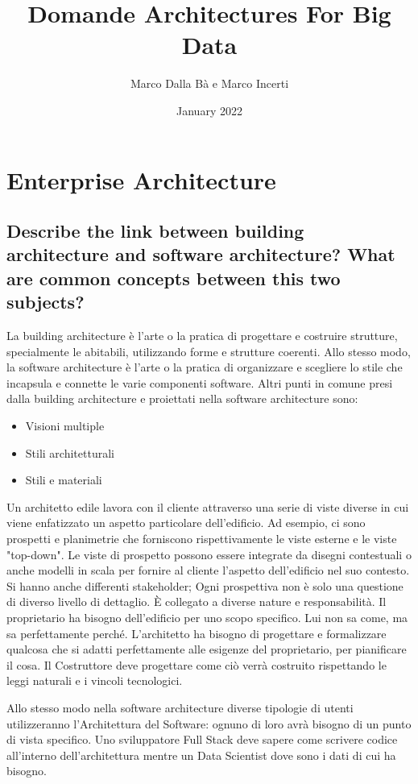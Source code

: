 \documentclass{article}
\title{Domande Architectures For Big Data}
\author{Marco Dalla Bà e Marco Incerti}
\date{January 2022}
\begin{document}
\maketitle
\tableofcontents

\section{Enterprise Architecture}
\subsection{Describe the link between building architecture and software architecture? What are common concepts between this two subjects?}

La building architecture è l’arte o la pratica di progettare e costruire strutture, specialmente le abitabili, utilizzando forme e strutture coerenti. Allo stesso modo, la software architecture è l’arte o la pratica di organizzare e scegliere lo stile che incapsula e connette le varie componenti software. 
Altri punti in comune presi dalla building architecture e proiettati nella software architecture sono:
\begin{itemize}
    \item Visioni multiple
    \item Stili architetturali
    \item Stili e materiali
\end{itemize}

Un architetto edile lavora con il cliente attraverso una serie di viste diverse in cui viene enfatizzato un aspetto particolare dell'edificio.
Ad esempio, ci sono prospetti e planimetrie che forniscono rispettivamente le viste esterne e le viste "top-down".
Le viste di prospetto possono essere integrate da disegni contestuali o anche modelli in scala per fornire al cliente l'aspetto dell'edificio nel suo contesto.
Si hanno anche differenti stakeholder; Ogni prospettiva non è solo una questione di diverso livello di dettaglio. È collegato a diverse nature e responsabilità.
Il proprietario ha bisogno dell'edificio per uno scopo specifico. Lui non sa come, ma sa perfettamente perché.
L'architetto ha bisogno di progettare e formalizzare qualcosa che si adatti perfettamente alle esigenze del proprietario, per pianificare il cosa.
Il Costruttore deve progettare come ciò verrà costruito rispettando le leggi naturali e i vincoli tecnologici.

Allo stesso modo nella software architecture diverse tipologie di utenti utilizzeranno l'Architettura del Software: ognuno di loro avrà bisogno di un punto di vista specifico.
Uno sviluppatore Full Stack deve sapere come scrivere codice all'interno dell'architettura mentre un Data Scientist dove sono i dati di cui ha bisogno.
\end{document}
